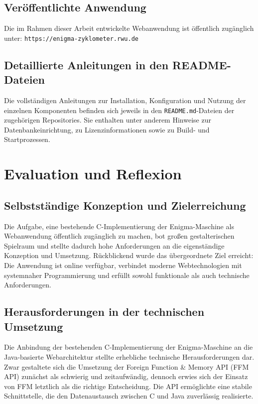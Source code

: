 \documentclass[12pt, ngerman, a4paper, numbers=noenddot]{article}
\begin{document}
\subsection{Veröffentlichte Anwendung}

Die im Rahmen dieser Arbeit entwickelte Webanwendung ist öffentlich zugänglich unter:  
\lstinline|https://enigma-zyklometer.rwu.de|

\subsection{Detaillierte Anleitungen in den README-Dateien}

Die vollständigen Anleitungen zur Installation, Konfiguration und Nutzung der einzelnen Komponenten befinden sich jeweils in den \lstinline|README.md|-Dateien der zugehörigen Repositories.  
Sie enthalten unter anderem Hinweise zur Datenbankeinrichtung, zu Lizenzinformationen sowie zu Build- und Startprozessen.  





\newpage
\section{Evaluation und Reflexion}

\subsection{Selbstständige Konzeption und Zielerreichung}

Die Aufgabe, eine bestehende C-Implementierung der Enigma-Maschine als Webanwendung öffentlich zugänglich zu machen, bot großen gestalterischen Spielraum und stellte dadurch hohe Anforderungen an die eigenständige Konzeption und Umsetzung. Rückblickend wurde das übergeordnete Ziel erreicht: Die Anwendung ist online verfügbar, verbindet moderne Webtechnologien mit systemnaher Programmierung und erfüllt sowohl funktionale als auch technische Anforderungen.

\subsection{Herausforderungen in der technischen Umsetzung}

Die Anbindung der bestehenden C-Implementierung der Enigma-Maschine an die Java-basierte Webarchitektur stellte erhebliche technische Herausforderungen dar. Zwar gestaltete sich die Umsetzung der Foreign Function \& Memory API (FFM API) zunächst als schwierig und zeitaufwändig, dennoch erwies sich der Einsatz von FFM letztlich als die richtige Entscheidung. Die API ermöglichte eine stabile Schnittstelle, die den Datenaustausch zwischen C und Java zuverlässig realisierte.
\end{document}
